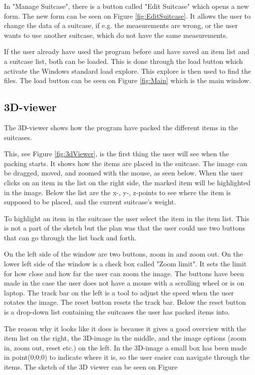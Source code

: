 In "Manage Suitcase", there is a button called "Edit Suitcase" which opens a new form. The new form can be seen on Figure \ref{fig:EditSuitcase}. It allows the user to change the data of a suitcase, if e.g. the measurements are wrong, or the user wants to use another suitcase, which do not have the same measurements.

If the user already have used the program before and have saved an item list and a suitcase list, both can be loaded. This is done through the load button which activate the Windows standard load explore. This explore is then used to find the files. The load button can be seen on Figure \ref{fig:Main} which is the main window.

\subsection{3D-viewer}
The 3D-viewer shows how the program have packed the different items in the suitcases.


This, see Figure \ref{fig:3dViewer}, is the first thing the user will see when the packing starts. It shows how the items are placed in the suitcase.
The image can be dragged, moved, and zoomed with the mouse, as seen below. When the user clicks on an item in the list on the right side, the marked item will be highlighted in the image. Below the list are the x-, y-, z-points to see where the item is supposed to be placed, and the current suitcase's weight.

To highlight an item in the suitcase the user select the item in the item list. This is not a part of the sketch but the plan was that the user could use two buttons that can go through the list back and forth.

On the left side of the window are two buttons, zoom in and zoom out. On the lower left side of the window is a check box called "Zoom limit". It sets the limit for how close and how far the user can zoom the image. The buttons have been made in the case the user does not have a mouse with a scrolling wheel or is on laptop. The track bar on the left is a tool to adjust the speed when the user rotates the image. The reset button resets the track bar. Below the reset button is a drop-down list containing the suitcases the user has packed items into.

The reason why it looks like it does is because it gives a good overview with the item list on the right, the 3D-image in the middle, and the image options (zoom in, zoom out, reset etc.) on the left.
In the 3D-image a small box has been made in point(0;0;0) to indicate where it is, so the user easier can navigate through the items.
The sketch of the 3D viewer can be seen on Figure %
